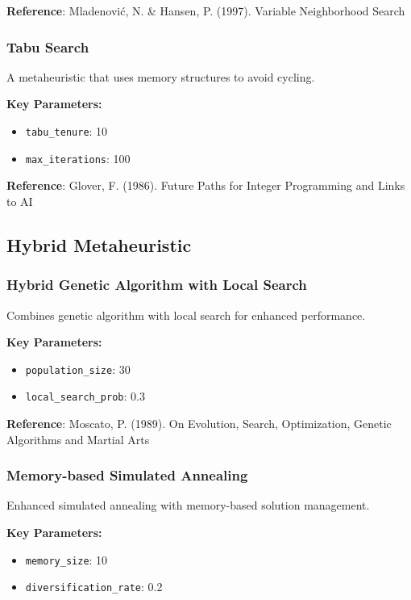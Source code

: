 \documentclass[11pt,a4paper]{article}
\begin{document}
\textbf{Reference}: Mladenović, N. & Hansen, P. (1997). Variable Neighborhood Search

\subsubsection{Tabu Search}

A metaheuristic that uses memory structures to avoid cycling.

\textbf{Key Parameters:}
\begin{itemize}
    \item \texttt{tabu_tenure}: 10
    \item \texttt{max_iterations}: 100
\end{itemize}

\textbf{Reference}: Glover, F. (1986). Future Paths for Integer Programming and Links to AI

\subsection{Hybrid Metaheuristic}

\subsubsection{Hybrid Genetic Algorithm with Local Search}

Combines genetic algorithm with local search for enhanced performance.

\textbf{Key Parameters:}
\begin{itemize}
    \item \texttt{population_size}: 30
    \item \texttt{local_search_prob}: 0.3
\end{itemize}

\textbf{Reference}: Moscato, P. (1989). On Evolution, Search, Optimization, Genetic Algorithms and Martial Arts

\subsubsection{Memory-based Simulated Annealing}

Enhanced simulated annealing with memory-based solution management.

\textbf{Key Parameters:}
\begin{itemize}
    \item \texttt{memory_size}: 10
    \item \texttt{diversification_rate}: 0.2
\end{itemize}
\end{document}
